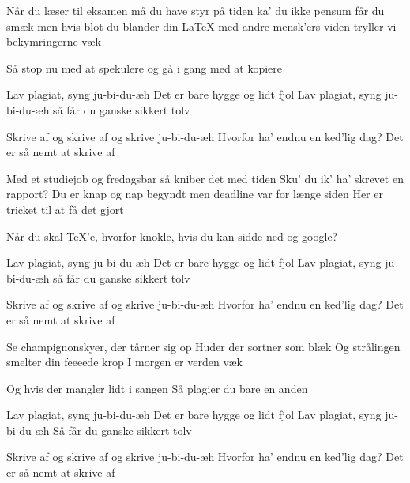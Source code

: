\documentclass[a4paper,11pt]{article}
\begin{document}
\begin{song}
Når du læser til eksamen må du have styr på tiden
ka' du ikke pensum får du smæk
men hvis blot du blander din \LaTeX{} med andre mensk'ers viden
tryller vi bekymringerne væk

Så stop nu med at spekulere
og gå i gang med at kopiere

Lav plagiat, syng ju-bi-du-æh
Det er bare hygge og lidt fjol
Lav plagiat, syng ju-bi-du-æh
så får du ganske sikkert tolv

Skrive af og skrive af og skrive ju-bi-du-æh
Hvorfor ha' endnu en ked'lig dag?
Det er så nemt at skrive af

Med et studiejob og fredagsbar så kniber det med tiden
Sku' du ik' ha' skrevet en rapport?
Du er knap og nap begyndt men deadline var for længe siden
Her er tricket til at få det gjort

Når du skal TeX'e, hvorfor knokle,
hvis du kan sidde ned og google?

Lav plagiat, syng ju-bi-du-æh
Det er bare hygge og lidt fjol
Lav plagiat, syng ju-bi-du-æh
så får du ganske sikkert tolv

Skrive af og skrive af og skrive ju-bi-du-æh
Hvorfor ha' endnu en ked'lig dag?
Det er så nemt at skrive af




Se champignonskyer, der tårner sig op
Huder der sortner som blæk
Og strålingen smelter din feeeede krop
I morgen er verden væk

Og hvis der mangler lidt i sangen
Så plagier du bare en anden

Lav plagiat, syng ju-bi-du-æh
Det er bare hygge og lidt fjol
Lav plagiat, syng ju-bi-du-æh
Så får du ganske sikkert tolv

Skrive af og skrive af og skrive ju-bi-du-æh
Hvorfor ha' endnu en ked'lig dag?
Det er så nemt at skrive af

\end{song}
\end{document}
